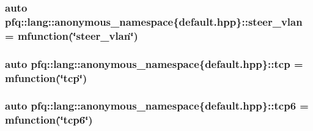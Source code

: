 \hypertarget{namespacepfq_1_1lang_1_1anonymous__namespace_02default_8hpp_03_a2c6a8ad5a3ae8b60a6a3d18a510f22ac}{
\subsubsection[{steer\+\_\+vlan}]{\setlength{\rightskip}{0pt plus 5cm}auto pfq\+::lang\+::anonymous\+\_\+namespace\{default.\+hpp\}\+::steer\+\_\+vlan = {\bf mfunction}(\char`\"{}steer\+\_\+vlan\char`\"{})}}\label{namespacepfq_1_1lang_1_1anonymous__namespace_02default_8hpp_03_a2c6a8ad5a3ae8b60a6a3d18a510f22ac}
\hypertarget{namespacepfq_1_1lang_1_1anonymous__namespace_02default_8hpp_03_a5b8ca91a33a120e7e0807e63c8b51b28}{
\subsubsection[{tcp}]{\setlength{\rightskip}{0pt plus 5cm}auto pfq\+::lang\+::anonymous\+\_\+namespace\{default.\+hpp\}\+::tcp = {\bf mfunction}(\char`\"{}tcp\char`\"{})}}\label{namespacepfq_1_1lang_1_1anonymous__namespace_02default_8hpp_03_a5b8ca91a33a120e7e0807e63c8b51b28}
\hypertarget{namespacepfq_1_1lang_1_1anonymous__namespace_02default_8hpp_03_ad5806a9b77c5975d08f0d0d317faa7a0}{
\subsubsection[{tcp6}]{\setlength{\rightskip}{0pt plus 5cm}auto pfq\+::lang\+::anonymous\+\_\+namespace\{default.\+hpp\}\+::tcp6 = {\bf mfunction}(\char`\"{}tcp6\char`\"{})}}\label{namespacepfq_1_1lang_1_1anonymous__namespace_02default_8hpp_03_ad5806a9b77c5975d08f0d0d317faa7a0}

